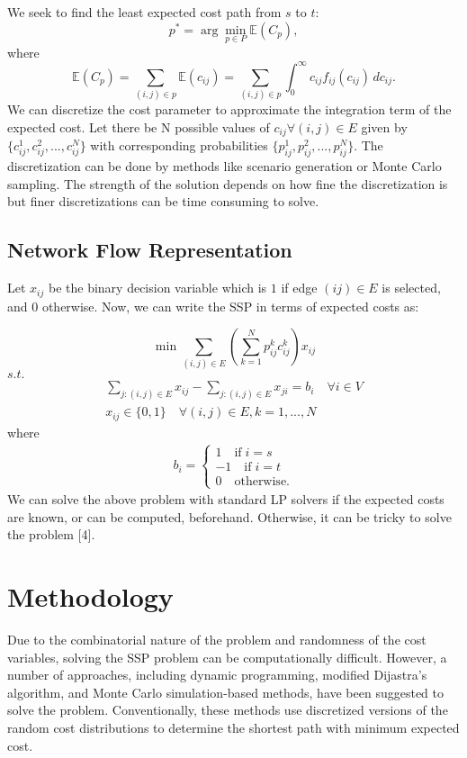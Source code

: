 \documentclass{article}
\begin{document}
We seek to find the least expected cost path from $s$ to $t$:
\[p^* = \arg \min_{p \in P} \mathbb{E}(C_p),\] 
where \[\mathbb{E}(C_p) = \sum_{(i,j) \in p}\mathbb{E} (c_{ij})= \sum_{(i,j) \in p} \int_{0}^\infty c_{ij} f_{ij}(c_{ij}) \, dc_{ij}.\]
We can discretize the cost parameter to approximate the integration term of the expected cost. Let there be N possible values of $c_{ij} \forall (i,j) \in E$ given by $\{ c_{ij}^1, c_{ij}^2, ..., c_{ij}^N\}$ with corresponding probabilities $\{ p_{ij}^1, p_{ij}^2, ..., p_{ij}^N\}$. The discretization can be done by methods like scenario generation or Monte Carlo sampling. The strength of the solution depends on how fine the discretization is but finer discretizations can be time consuming to solve.

\subsection{Network Flow Representation}

Let $x_{ij}$ be the binary decision variable which is $1$ if edge $(ij) \in E$ is selected, and $0$ otherwise. Now, we can write the SSP in terms of expected costs as:

\begin{equation}\label{SSPIP}
        \min \sum_{(i,j) \in E} \left( \sum_{k=1}^N p_{ij}^k c_{ij}^k \right) x_{ij} 
    \end{equation}
    $s.t.$
    \begin{gather}
        \sum_{j:(i,j) \in E}  x_{ij} - \sum_{j:(i,j) \in E}  x_{ji} = b_i \quad \forall i \in V \label{FlowConserve}\\
        x_{ij} \in \{0,1\} \quad \forall (i,j) \in E, k={1,...,N} \label{Integrality}
    \end{gather}
where \begin{align*}
        b_i = 
        \begin{cases}
            1 \quad \text{if} \; i = s \\
            -1 \quad \text{if} \; i = t \\
            0 \quad \text{otherwise}.
        \end{cases}
    \end{align*}
We can solve the above problem with standard LP solvers if the expected costs are known, or can be computed, beforehand. Otherwise, it can be tricky to solve the problem [4]. 

\section{Methodology}
Due to the combinatorial nature of the problem and randomness of the cost variables, solving the SSP problem can
be computationally difficult. However, a number of approaches, including dynamic programming, modified 
Dijastra's algorithm, and Monte Carlo simulation-based methods, have been suggested to solve the problem.
Conventionally, these methods use discretized versions of the random cost distributions to determine the
shortest path with minimum expected cost. 
\end{document}
